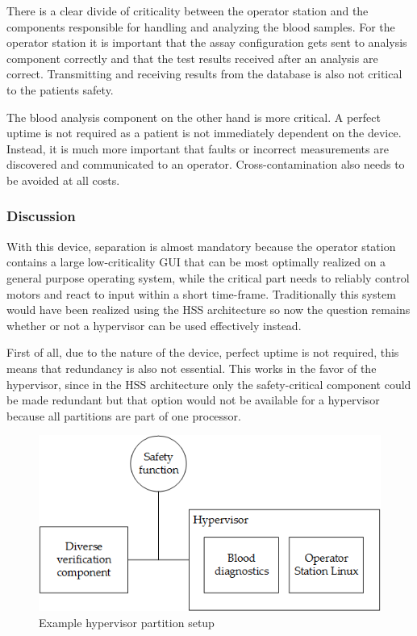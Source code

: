 There is a clear divide of criticality between the operator station and the components responsible for handling and analyzing the blood samples. For the operator station it is important that the assay configuration gets sent to analysis component correctly and that the test results received after an analysis are correct. Transmitting and receiving results from the database is also not critical to the patients safety.

The blood analysis component on the other hand is more critical. A perfect uptime is not required as a patient is not immediately dependent on the device. Instead, it is much more important that faults or incorrect measurements are discovered and communicated to an operator. Cross-contamination also needs to be avoided at all costs.

\subsubsection{Discussion}
With this device, separation is almost mandatory because the operator station contains a large low-criticality \gls{GUI} that can be most optimally realized on a general purpose operating system, while the critical part needs to reliably control motors and react to input within a short time-frame. Traditionally this system would have been realized using the \gls{HSS} architecture so now the question remains whether or not a hypervisor can be used effectively instead.

First of all, due to the nature of the device, perfect uptime is not required, this means that redundancy is also not essential. This works in the favor of the hypervisor, since in the \gls{HSS} architecture only the safety-critical component could be made redundant but that option would not be available for a hypervisor because all partitions are part of one processor. 

\begin{figure}
\centering
\includegraphics[scale=0.75]{Figures/blood_diagnostics_arch}
\decoRule
\caption{Example hypervisor partition setup}
\label{fig:blood_diagnostics_hv_arch}
\end{figure}


